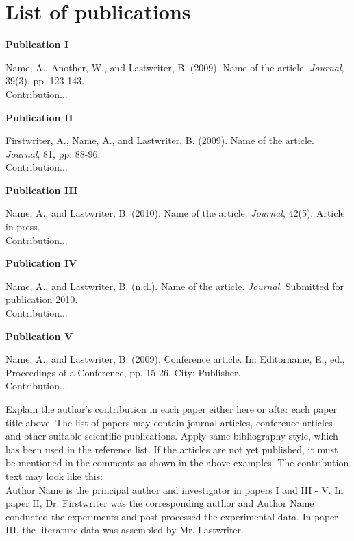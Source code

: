 \section*{List of publications}

\textbf{Publication I}

Name, A., Another, W., and Lastwriter, B. (2009). Name of the article. \emph{Journal}, 39(3), pp. 123-143.\\

Contribution...\\
\vspace{3mm}

\textbf{Publication II}

Firstwriter, A., Name, A., and Lastwriter, B. (2009). Name of the article. \emph{Journal}, 81, pp. 88-96.\\

Contribution...\\
\vspace{3mm}

\textbf{Publication III}

Name, A., and Lastwriter, B. (2010). Name of the article. \emph{Journal}, 42(5). Article in press.\\

Contribution...\\
\vspace{3mm}

\textbf{Publication IV}

Name, A., and Lastwriter, B. (n.d.). Name of the article. \emph{Journal}. Submitted for publication 2010.\\

Contribution...\\
\vspace{3mm}

\textbf{Publication V}

Name, A., and Lastwriter, B. (2009). Conference article. In: Editorname, E., ed., Proceedings of a Conference, pp. 15-26. City: Publisher.\\

Contribution...\\
\vspace{3mm}

Explain the author's contribution in each paper either here or after each paper title above. The list of papers may contain journal articles, conference articles and other suitable scientific publications. Apply same bibliography style, which has been used in the reference list. If the articles are not yet published, it must be mentioned in the comments as shown in the above examples. The contribution text may look like this:\\

Author Name is the principal author and investigator in papers I and III - V. In paper II, Dr. Firstwriter was the corresponding author and Author Name conducted the experiments and post processed the experimental data. In paper III, the literature data was assembled by Mr. Lastwriter.\\


